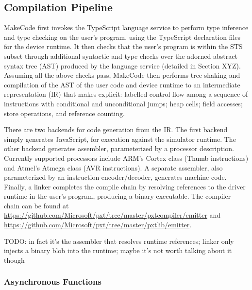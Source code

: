 \subsection{Compilation Pipeline}

MakeCode first invokes the TypeScript language service to perform type inference and type checking on the 
user's program, using the TypeScript declaration files for the device runtime.   It then checks that the
user's program is within the STS subset through additional syntactic and type checks over the adorned
abstract syntax tree (AST) produced by the language service (detailed in Section XYZ).  Assuming all the
above checks pass, MakeCode then performs tree shaking and compilation of the AST of the user code and
device runtime to an intermediate representation (IR) that makes explicit: labelled control flow among a
sequence of instructions with conditional and unconditional jumps; heap cells; field accesses; store operations,
and reference counting.

There are two backends for code generation from the IR. The first backend simply generates JavaScript,
for execution against the simulator runtime.  The other backend generates assembler, parameterized by a
processor description.  Currently supported processors include ARM's Cortex class (Thumb instructions)
and Atmel's Atmega class (AVR instructions). A separate assembler, also parameterized by an instruction
encoder/decoder, generates machine code. Finally, a linker completes the compile chain by resolving
references to the driver runtime in the user's program, producing a binary executable. The compiler chain
can be found at \url{https://github.com/Microsoft/pxt/tree/master/pxtcompiler/emitter} and 
\url{https://github.com/Microsoft/pxt/tree/master/pxtlib/emitter}.

TODO: in fact it's the assembler that resolves runtime references; linker only injects a binary blob into the runtime; maybe it's not worth talking about it though

\subsubsection{Asynchronous Functions}

